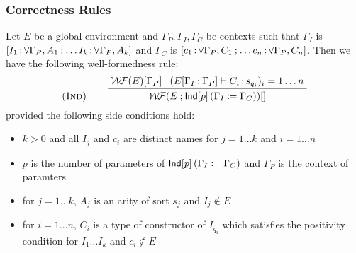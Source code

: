 \documentclass{article}
\begin{document}
\subsubsection{Correctness Rules}
Let $E$ be a global environment and $\Gamma_P, \Gamma_I, \Gamma_C$ be contexts
such that $\Gamma_I$ is
$[I_1{\,:\,} \forall\Gamma_P, A_1 \mathbin{;} \ldots I_k{\,:\,} \forall \Gamma_P, A_k]$
and $\Gamma_C$ is
$[c_1{\,:\,} \forall\Gamma_P, C_1 \mathbin{;} \ldots c_n{\,:\,} \forall \Gamma_P, C_n]$.
Then we have the following well-formedness rule:
\[
\prule{Ind}\hspace{5ex}
\prftree
{\wf(E)[\Gamma_P]}
{(E[\Gamma_I\scln\Gamma_P] \vdash \lasm{C_i}{s_{q_i}})_i=1\ldots n}
{\wf(E\scln \Ind{p}{\Gamma_I}{\Gamma_C})[]}
\]
provided the following side conditions hold:
\begin{itemize}
\item $k > 0$ and all $I_j$ and $c_i$ are distinct names for $j=1\ldots k$ and
  $i=1\ldots n$
\item $p$ is the number of parameters of $\mathsf{Ind}[p]\left(\Gamma_I \coloneqq \Gamma_C\right)$ and
  $\Gamma_P$ is the context of paramters
\item for $j=1\ldots k$, $A_j$ is an arity of sort $s_j$ and $I_j \not\in E$
\item for $i=1\ldots n$, $C_i$ is a type of constructor of $I_{q_i}$ which
  satisfies the positivity condition for $I_1 \ldots I_k$ and $c_i \not\in E$
\end{itemize}
\end{document}

